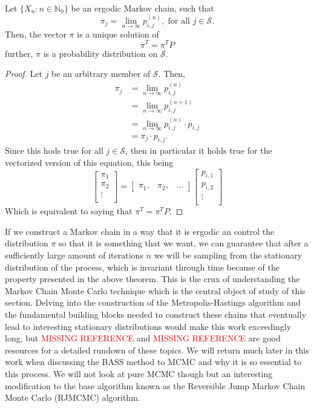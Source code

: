 \begin{theorem}
	Let $\{ X_n: n \in \mathbb{N}_0\}$ be an ergodic Markov chain, such that 
	\[ \pi_j = \lim_{n \rightarrow \infty} p_{i,j}^{(n)}, \text{ for all } j \in \mathcal{S}. \]
	Then, the vector $\pi$ is a unique solution of 
	\[ \pi^T = \pi^T P \]
	further, $\pi$ is a probability distribution on $\mathcal{S}$. 
\end{theorem}

\begin{proof}
	Let $j$ be an arbitrary member of $\mathcal{S}$. Then, 
	\begin{align*}
		\pi_j &= \lim_{n \rightarrow \infty} p_{i,j}^{(n)} \\
		&= \lim_{n \rightarrow \infty} p_{i,j}^{(n+1)} \\
		&= \lim_{n \rightarrow \infty} p_{i,j}^{(n)} \cdot p_{i,j} \\
		&= \pi_j \cdot p_{i,j}.
	\end{align*}
	Since this hods true for all $j \in \mathcal{S}$, then in particular it holds true for the vectorized version of this equation, this being 
	\[ \begin{bmatrix}
		\pi_1 \\
		\pi_2 \\
		\vdots \\
	\end{bmatrix} = 
	\begin{bmatrix}
		\pi_1, &
		\pi_2, &
		\ldots 
	\end{bmatrix} 
	\begin{bmatrix}
		p_{i,1} \\
		p_{i,2} \\
		\vdots \\
	\end{bmatrix} \]
Which is equivalent to saying that $\pi^T = \pi^T P$.
\end{proof}

If we construct a Markov chain in a way that it is ergodic an control the distribution $\pi$ so that it is something that we want, we can guarantee that after a sufficiently large amount of iterations $n$ we will be sampling from the stationary distribution of the process, which is invariant through time because of the property presented in the above theorem. This is the crux of understanding the Markov Chain Monte Carlo technique which is the central object of study of this section. Delving into the construction of the Metropolis-Hastings algorithm and the fundamental building blocks needed to construct these chains that eventually lead to interesting stationary distributions would make this work exceedingly long, but \textcolor{red}{MISSING REFERENCE} and \textcolor{red}{MISSING REFERENCE} are good resources for a detailed rundown of these topics. We will return much later in this work when discussing the BASS method to MCMC and why it is so essential to this process. We will not look at pure MCMC though but an interesting modification to the base algorithm known as the Reversible Jump Markov Chain Monte Carlo (RJMCMC) algorithm. 

